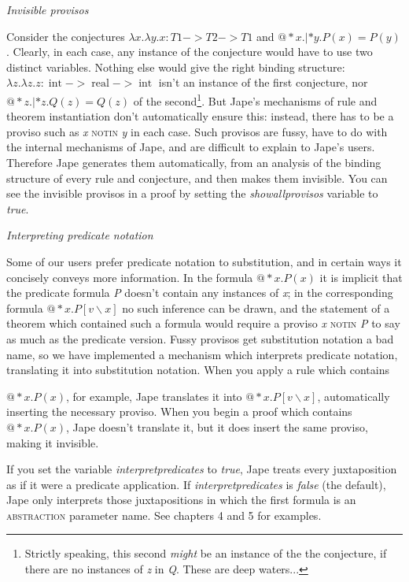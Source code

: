 \documentclass[11pt]{book}
\begin{document}
\textit{Invisible provisos}


Consider the conjectures $\lambda x.\lambda y.x:T1->T2->T1$ and $@*x.|*y.P(x)=P(y)$ . Clearly, in each case, any instance of the conjecture would have to use two distinct variables. Nothing else would give the right binding structure: $\lambda z.\lambda z.z:\operatorname{int} ->\operatorname{real}->\operatorname{int} $ isn't an instance of the first conjecture, nor $@*z.|*z.Q(z)=Q(z)$ of the second\footnote{Strictly speaking, this second \textit{might} be an instance of the the conjecture, if there are no instances of \textit{z} in \textit{Q}. These are deep waters...}. But Jape's mechanisms of rule and theorem instantiation don't automatically ensure this: instead, there has to be a proviso such as \textit{x} \textsc{notin} \textit{y} in each case. Such provisos are fussy, have to do with the internal mechanisms of Jape, and are difficult to explain to Jape's users. Therefore Jape generates them automatically, from an analysis of the binding structure of every rule and conjecture, and then makes them invisible. You can see the invisible provisos in a proof by setting the \textit{showallprovisos} variable to \textit{true}.


\textit{Interpreting predicate notation}


Some of our users prefer predicate notation to substitution, and in certain ways it concisely conveys more information. In the formula $@*x.P(x)$ it is implicit that the predicate formula \textit{P} doesn't contain any instances of \textit{x}; in the corresponding formula $@*x.P\left[ v\backslash x\right] $ no such inference can be drawn, and the statement of a theorem which contained such a formula would require a proviso \textit{x} \textsc{notin} \textit{P} to say as much as the predicate version. Fussy provisos get substitution notation a bad name, so we have implemented a mechanism which interprets predicate notation, translating it into substitution notation. When you apply a rule which contains

$@*x.P(x)$, for example, Jape translates it into $@*x.P\left[ v\backslash x\right] $, automatically inserting the necessary proviso. When you begin a proof which contains $@*x.P(x)$, Jape doesn't translate it, but it does insert the same proviso, making it invisible.


If you set the variable \textit{interpretpredicates} to \textit{true}, Jape treats every juxtaposition as if it were a predicate application. If \textit{interpretpredicates} is \textit{false} (the default), Jape only interprets those juxtapositions in which the first formula is an \textsc{abstraction} parameter name. See chapters 4 and 5 for examples.
\end{document}
